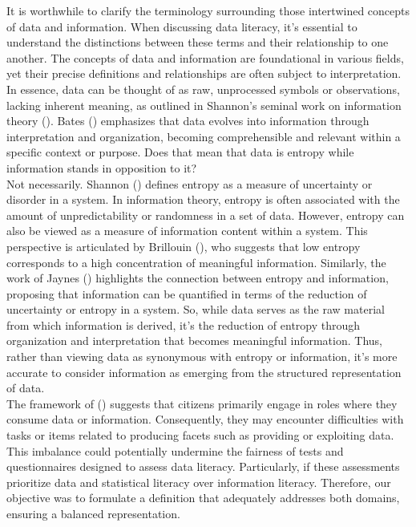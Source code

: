 \documentclass[
  12pt,
  a4paper,
  twoside]{article}
\begin{document}
It is worthwhile to clarify the terminology surrounding those intertwined concepts of data and information. When discussing data literacy, it's essential to understand the distinctions between these terms and their relationship to one another.
The concepts of data and information are foundational in various fields, yet their precise definitions and relationships are often subject to interpretation. In essence, data can be thought of as raw, unprocessed symbols or observations, lacking inherent meaning, as outlined in Shannon's seminal work on information theory (). Bates () emphasizes that data evolves into information through interpretation and organization, becoming comprehensible and relevant within a specific context or purpose. Does that mean that data is entropy while information stands in opposition to it?\\
Not necessarily. Shannon () defines entropy as a measure of uncertainty or disorder in a system. In information theory, entropy is often associated with the amount of unpredictability or randomness in a set of data. However, entropy can also be viewed as a measure of information content within a system. This perspective is articulated by Brillouin (), who suggests that low entropy corresponds to a high concentration of meaningful information. Similarly, the work of Jaynes () highlights the connection between entropy and information, proposing that information can be quantified in terms of the reduction of uncertainty or entropy in a system.
So, while data serves as the raw material from which information is derived, it's the reduction of entropy through organization and interpretation that becomes meaningful information. Thus, rather than viewing data as synonymous with entropy or information, it's more accurate to consider information as emerging from the structured representation of data.\\
The framework of () suggests that citizens primarily engage in roles where they consume data or information. Consequently, they may encounter difficulties with tasks or items related to producing facets such as providing or exploiting data. This imbalance could potentially undermine the fairness of tests and questionnaires designed to assess data literacy. Particularly, if these assessments prioritize data and statistical literacy over information literacy. Therefore, our objective was to formulate a definition that adequately addresses both domains, ensuring a balanced representation.
\end{document}
